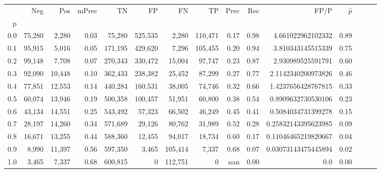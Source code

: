 \begin{tabular}{rrrrrrrrrrrrrrr}
\toprule
{} &     Neg &     Pos & mPrec &       TN &       FP &       FN &       TP &  Prec &   Rec &                 FP/P & $\hat{p}$ \\
p   &         &         &       &          &          &          &          &       &       &                      &           \\
\midrule
0.0 &  75,280 &   2,280 &  0.03 &   75,280 &  525,535 &    2,280 &  110,471 &  0.17 &  0.98 &    4.661022962102332 &      0.89 \\
0.1 &  95,915 &   5,016 &  0.05 &  171,195 &  429,620 &    7,296 &  105,455 &  0.20 &  0.94 &    3.810343145515339 &      0.75 \\
0.2 &  99,148 &   7,708 &  0.07 &  270,343 &  330,472 &   15,004 &   97,747 &  0.23 &  0.87 &    2.930989525591791 &      0.60 \\
0.3 &  92,090 &  10,448 &  0.10 &  362,433 &  238,382 &   25,452 &   87,299 &  0.27 &  0.77 &   2.1142340200973826 &      0.46 \\
0.4 &  77,851 &  12,553 &  0.14 &  440,284 &  160,531 &   38,005 &   74,746 &  0.32 &  0.66 &   1.4237656428767815 &      0.33 \\
0.5 &  60,074 &  13,946 &  0.19 &  500,358 &  100,457 &   51,951 &   60,800 &  0.38 &  0.54 &   0.8909632730530106 &      0.23 \\
0.6 &  43,134 &  14,551 &  0.25 &  543,492 &   57,323 &   66,502 &   46,249 &  0.45 &  0.41 &   0.5084034731399278 &      0.15 \\
0.7 &  28,197 &  14,260 &  0.34 &  571,689 &   29,126 &   80,762 &   31,989 &  0.52 &  0.28 &  0.25832143395623985 &      0.09 \\
0.8 &  16,671 &  13,255 &  0.44 &  588,360 &   12,455 &   94,017 &   18,734 &  0.60 &  0.17 &  0.11046465219820667 &      0.04 \\
0.9 &   8,990 &  11,397 &  0.56 &  597,350 &    3,465 &  105,414 &    7,337 &  0.68 &  0.07 &  0.03073143475445894 &      0.02 \\
1.0 &   3,465 &   7,337 &  0.68 &  600,815 &        0 &  112,751 &        0 &   nan &  0.00 &                  0.0 &      0.00 \\
\bottomrule
\end{tabular}
